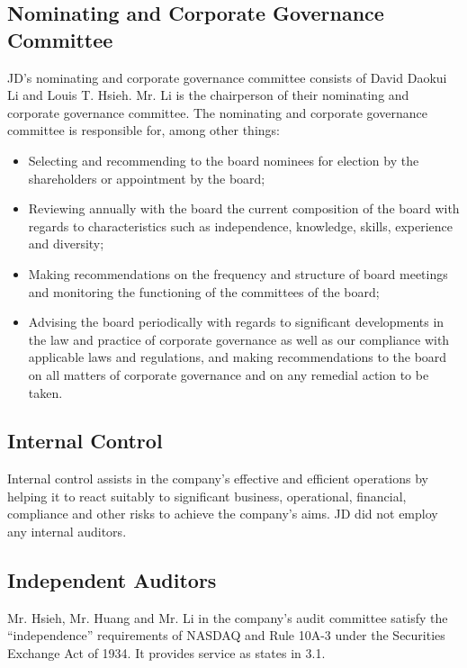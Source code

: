 \subsection{Nominating and Corporate Governance Committee}
JD’s nominating and corporate governance committee consists of David Daokui Li and Louis T. Hsieh. Mr. Li is the chairperson of their nominating and corporate governance committee. The nominating and corporate governance committee is responsible for, among other things:
\begin{itemize}
\item	Selecting and recommending to the board nominees for election by the shareholders or appointment by the board;
\item	Reviewing annually with the board the current composition of the board with regards to characteristics such as independence, knowledge, skills, experience and diversity;
\item	Making recommendations on the frequency and structure of board meetings and monitoring the functioning of the committees of the board;
\item	Advising the board periodically with regards to significant developments in the law and practice of corporate governance as well as our compliance with applicable laws and regulations, and making recommendations to the board on all matters of corporate governance and on any remedial action to be taken.
\end{itemize}

\subsection{Internal Control}
Internal control assists in the company’s effective and efficient operations by helping it to react suitably to significant business, operational, financial, compliance and other risks to achieve the company’s aims. JD did not employ any internal auditors.


\subsection{Independent Auditors}
Mr. Hsieh, Mr. Huang and Mr. Li in the company’s audit committee satisfy the “independence” requirements of NASDAQ and Rule 10A-3 under the Securities Exchange Act of 1934. It provides service as states in 3.1.



